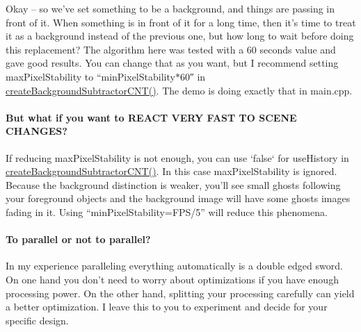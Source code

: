 Okay – so we’ve set something to be a background, and things are passing in front of it. When something is in front of it for a long time, then it’s time to treat it as a background instead of the previous one, but how long to wait before doing this replacement? The algorithm here was tested with a 60 seconds value and gave good results. You can change that as you want, but I recommend setting max\+Pixel\+Stability to “min\+Pixel\+Stability$\ast$60″ in \hyperlink{namespacecv_1_1bgsubcnt_a6a6efd913954320be33f39c32a4c5a7e}{create\+Background\+Subtractor\+C\+N\+T()}. The demo is doing exactly that in main.\+cpp.

\paragraph*{But what if you want to R\+E\+A\+CT V\+E\+RY F\+A\+ST TO S\+C\+E\+NE C\+H\+A\+N\+G\+ES?}

If reducing max\+Pixel\+Stability is not enough, you can use ‘false‘ for use\+History in \hyperlink{namespacecv_1_1bgsubcnt_a6a6efd913954320be33f39c32a4c5a7e}{create\+Background\+Subtractor\+C\+N\+T()}. In this case max\+Pixel\+Stability is ignored. Because the background distinction is weaker, you’ll see small ghosts following your foreground objects and the background image will have some ghosts images fading in it. Using “min\+Pixel\+Stability=F\+P\+S/5” will reduce this phenomena.

\paragraph*{To parallel or not to parallel?}

In my experience paralleling everything automatically is a double edged sword. On one hand you don’t need to worry about optimizations if you have enough processing power. On the other hand, splitting your processing carefully can yield a better optimization. I leave this to you to experiment and decide for your specific design. 